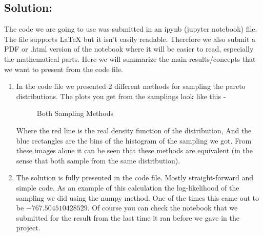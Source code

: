\documentclass[../main.tex]{subfiles}
\begin{document}
\subsection*{Solution:}
The code we are going to use was submitted in an ipynb (jupyter notebook) file. The file supports LaTeX but it isn't easily readable. Therefore we also submit a PDF or .html version of the notebook where it will be easier to read, especially the mathematical parts. Here we will summarize the main results/concepts that we want to present from the code file. 
\begin{enumerate}
    \item In the code file we presented 2 different methods for sampling the pareto distributions. The plots you get from the samplings look like this -

\begin{figure}[H]
\centering
{}%
\hfill %
%
\caption{Both Sampling Methods}
\end{figure}

Where the red line is the real density function of the distribution, And the blue rectangles are the bins of the histogram of the sampling we got. From these images alone it can be seen that these methods are equivalent (in the sense that both sample from the same distribution). \qedsymbol

\item The solution is fully presented in the code file. Mostly straight-forward and simple code. As an example of this calculation the log-likelihood of the sampling we did using the numpy method. One of the times this came out to be $-767.504510428529$. Of course you can check the notebook that we submitted for the result from the last time it ran before we gave in the project. \qedsymbol


\end{enumerate}
\end{document}
